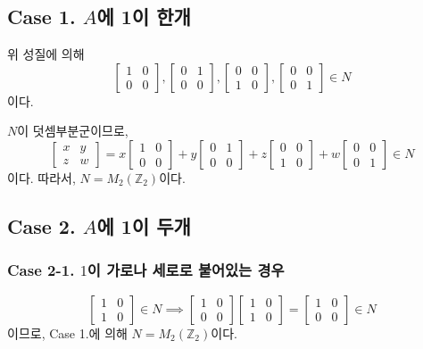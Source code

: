 \documentclass{article}
\begin{document}
\subsection{Case 1. $A$에 1이 한개} 
위 성질에 의해
$$\begin{bmatrix}
1&0  \\ 
0&0
\end{bmatrix},\begin{bmatrix}
0&1  \\ 
0&0
\end{bmatrix},\begin{bmatrix}
0&0  \\ 
1&0
\end{bmatrix},\begin{bmatrix}
0&0  \\ 
0&1
\end{bmatrix} \in N$$이다.

$N$이 덧셈부분군이므로,
$$
\begin{bmatrix}
x&y  \\ 
z&w 
\end{bmatrix} = x\begin{bmatrix}
1&0  \\ 
0&0
\end{bmatrix}+y\begin{bmatrix}
0&1  \\ 
0&0
\end{bmatrix}+z\begin{bmatrix}
0&0  \\ 
1&0
\end{bmatrix}+w\begin{bmatrix}
0&0  \\ 
0&1
\end{bmatrix} \in N
$$이다. 따라서, $N = M_2 ( \mathbb{Z}_2)$이다.

\subsection{Case 2. $A$에 1이 두개}
\subsubsection{Case 2-1. $1$이 가로나 세로로 붙어있는 경우}
$$
\begin{bmatrix}
1&0  \\ 
1&0
\end{bmatrix} \in N \implies
\begin{bmatrix}
1&0  \\ 
0&0
\end{bmatrix} 
\begin{bmatrix}
1&0  \\ 
1&0
\end{bmatrix} =
\begin{bmatrix}
1&0  \\ 
0&0
\end{bmatrix} \in N
$$이므로, Case 1.에 의해 $N = M_2 ( \mathbb{Z}_2)$이다.
\end{document}
